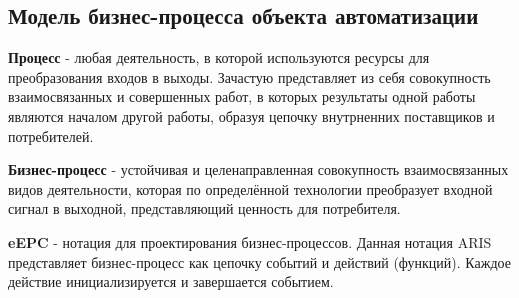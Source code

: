 \newpage
\subsection{Модель бизнес-процесса объекта автоматизации}

\textbf{Процесс} - любая деятельность, в которой используются ресурсы для преобразования входов в выходы.
Зачастую представляет из себя совокупность взаимосвязанных и совершенных работ,
в которых результаты одной работы являются началом другой работы,
образуя цепочку внутрненних поставщиков и потребителей.

\textbf{Бизнес-процесс} - устойчивая и целенаправленная совокупность взаимосвязанных видов деятельности,
которая по определённой технологии преобразует входной сигнал в выходной, представляющий ценность для потребителя.

\textbf{eEPC} - нотация для проектирования бизнес-процессов.
Данная нотация ARIS представляет бизнес-процесс как цепочку событий и действий (функций).
Каждое действие инициализируется и завершается событием.

